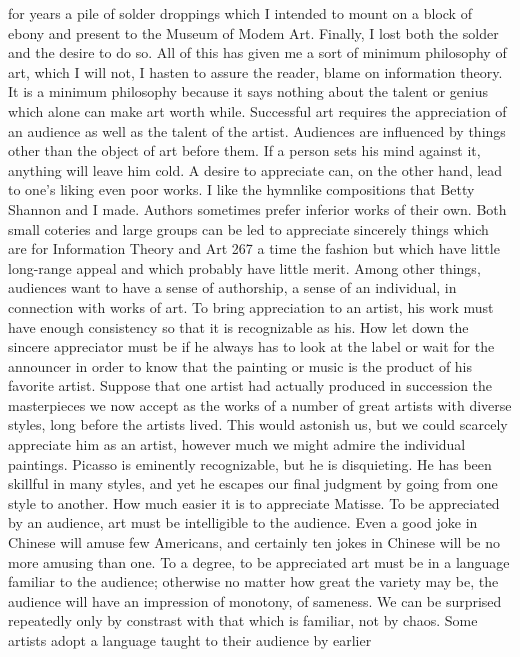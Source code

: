 {{{{{{{{{{{{for years a pile of solder droppings which I intended to mount on
a block of ebony and present to the Museum of Modem Art.
Finally, I lost both the solder and the desire to do so.
All of this has given me a sort of minimum philosophy of art,
which I will not, I hasten to assure the reader, blame on information
theory. It is a minimum philosophy because it says nothing
about the talent or genius which alone can make art worth while.
Successful art requires the appreciation of an audience as well
as the talent of the artist. Audiences are influenced by things other
than the object of art before them. If a person sets his mind against
it, anything will leave him cold. A desire to appreciate can, on the
other hand, lead to one’s liking even poor works. I like the hymnlike
compositions that Betty Shannon and I made. Authors sometimes
prefer inferior works of their own. Both small coteries and
large groups can be led to appreciate sincerely things which are for
Information Theory and Art 267
a time the fashion but which have little long-range appeal and
which probably have little merit.
Among other things, audiences want to have a sense of authorship,
a sense of an individual, in connection with works of art. To
bring appreciation to an artist, his work must have enough consistency
so that it is recognizable as his. How let down the sincere
appreciator must be if he always has to look at the label or wait
for the announcer in order to know that the painting or music is
the product of his favorite artist.
Suppose that one artist had actually produced in succession the
masterpieces we now accept as the works of a number of great
artists with diverse styles, long before the artists lived. This would
astonish us, but we could scarcely appreciate him as an artist,
however much we might admire the individual paintings. Picasso
is eminently recognizable, but he is disquieting. He has been skillful
in many styles, and yet he escapes our final judgment by going from
one style to another. How much easier it is to appreciate Matisse.
To be appreciated by an audience, art must be intelligible to the
audience. Even a good joke in Chinese will amuse few Americans,
and certainly ten jokes in Chinese will be no more amusing than
one. To a degree, to be appreciated art must be in a language
familiar to the audience; otherwise no matter how great the variety
may be, the audience will have an impression of monotony, of
sameness. We can be surprised repeatedly only by constrast with
that which is familiar, not by chaos.
Some artists adopt a language taught to their audience by earlier
}}}}}}}}}}}}
